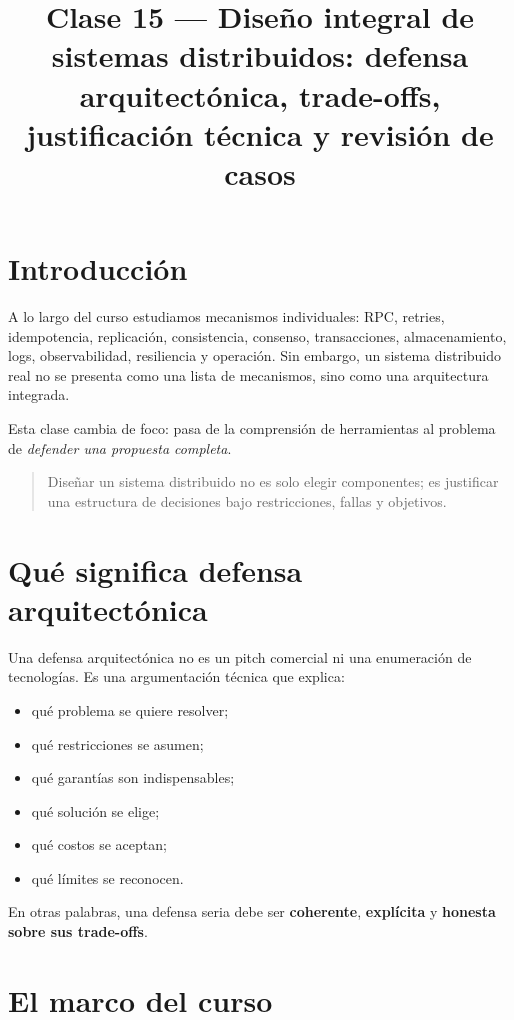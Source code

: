 \documentclass[variant=apuntes,cover=institutional,mode=screen]{ua-engineering-v6-article}
\title{Clase 15 --- Diseño integral de sistemas distribuidos: defensa arquitectónica, trade-offs, justificación técnica y revisión de casos}
\author{\UAProfessor}
\date{\UADate}
\begin{document}
\maketitle

\section{Introducción}

A lo largo del curso estudiamos mecanismos individuales: RPC, retries, idempotencia, replicación, consistencia, consenso, transacciones, almacenamiento, logs, observabilidad, resiliencia y operación. Sin embargo, un sistema distribuido real no se presenta como una lista de mecanismos, sino como una arquitectura integrada.

Esta clase cambia de foco: pasa de la comprensión de herramientas al problema de \emph{defender una propuesta completa}.

\begin{quote}
Diseñar un sistema distribuido no es solo elegir componentes; es justificar una estructura de decisiones bajo restricciones, fallas y objetivos.
\end{quote}

\section{Qué significa defensa arquitectónica}

Una defensa arquitectónica no es un pitch comercial ni una enumeración de tecnologías. Es una argumentación técnica que explica:

\begin{itemize}
\item qué problema se quiere resolver;
\item qué restricciones se asumen;
\item qué garantías son indispensables;
\item qué solución se elige;
\item qué costos se aceptan;
\item qué límites se reconocen.
\end{itemize}

En otras palabras, una defensa seria debe ser \textbf{coherente}, \textbf{explícita} y \textbf{honesta sobre sus trade-offs}.

\section{El marco del curso}
\end{document}
